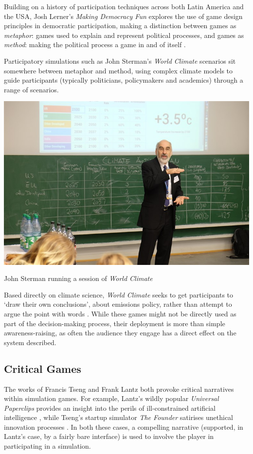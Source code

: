 \documentclass[nofonts,nols,justified,nobib]{tufte-book}
\begin{document}
Building on a history of participation techniques across both Latin America and the USA, Josh Lerner's \emph{Making Democracy Fun} explores the use of game design principles in democratic participation, making a distinction between games as \emph{metaphor}: games used to explain and represent political processes, and games as \emph{method}: making the political process a game in and of itself \cite{lerner_making_2014}. %

Participatory simulations such as John Sterman's \emph{World Climate} scenarios sit somewhere between metaphor and method, using complex climate models to guide participants (typically politicians, policymakers and academics) through a range of scenarios. 
\begin{marginfigure}
\includegraphics[width=\textwidth]{img/1/sterman-climate.jpg}
\caption{John Sterman running a session of \emph{World Climate} \cite{sterman_john_2013}}
\end{marginfigure}
Based directly on climate science, \emph{World Climate} seeks to get participants to `draw their own conclusions', about emissions policy, rather than attempt to argue the point with words \cite{sterman_john_2013}. While these games might not be directly used as part of the decision-making process, their deployment is more than simple awareness-raising, as often the audience they engage has a direct effect on the system described.


\subsection*{Critical Games}

The works of Francis Tseng and Frank Lantz both provoke critical narratives within simulation games. For example, Lantz's wildly popular \emph{Universal Paperclips} provides an insight into the perils of ill-constrained artificial intelligence \cite{lantz_universal_2017}, while Tseng's startup simulator \emph{The Founder} satirises unethical innovation processes \cite{tseng_founder_2017}. In both these cases, a compelling narrative (supported, in Lantz's case, by a fairly bare interface) is used to involve the player in participating in a simulation.
\end{document}
